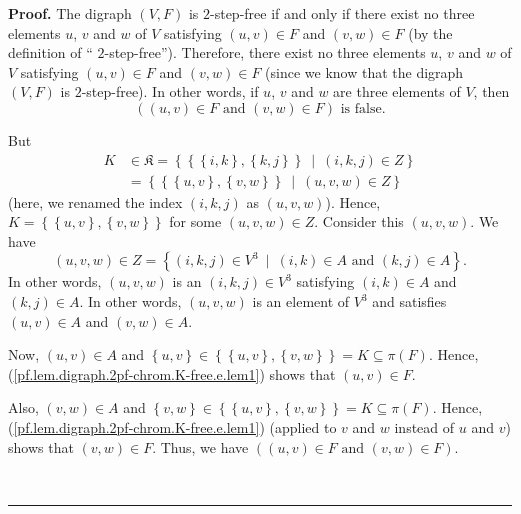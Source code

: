 \documentclass[numbers=enddot,12pt,final,onecolumn,notitlepage]{scrartcl}%
\theoremstyle{definition}
\newenvironment{proof}[1][Proof]{\noindent\textbf{#1.} }{\ \rule{0.5em}{0.5em}}
\newenvironment{verlong}{}{}
\begin{document}
\begin{verlong}
\begin{proof}
The digraph $\left(  V,F\right)  $ is $2$-step-free if and only if there exist
no three elements $u$, $v$ and $w$ of $V$ satisfying $\left(  u,v\right)  \in
F$ and $\left(  v,w\right)  \in F$ (by the definition of \textquotedblleft%
$2$-step-free\textquotedblright). Therefore, there exist no three elements
$u$, $v$ and $w$ of $V$ satisfying $\left(  u,v\right)  \in F$ and $\left(
v,w\right)  \in F$ (since we know that the digraph $\left(  V,F\right)  $ is
$2$-step-free). In other words, if $u$, $v$ and $w$ are three elements of $V$,
then%
\begin{equation}
\left(  \left(  u,v\right)  \in F\text{ and }\left(  v,w\right)  \in F\right)
\text{ is false.} \label{pf.lem.digraph.2pf-chrom.K-free.e.imp1.pf.2}%
\end{equation}


But%
\begin{align*}
K  &  \in\mathfrak{K}=\left\{  \left\{  \left\{  i,k\right\}  ,\left\{
k,j\right\}  \right\}  \ \mid\ \left(  i,k,j\right)  \in Z\right\} \\
&  =\left\{  \left\{  \left\{  u,v\right\}  ,\left\{  v,w\right\}  \right\}
\ \mid\ \left(  u,v,w\right)  \in Z\right\}
\end{align*}
(here, we renamed the index $\left(  i,k,j\right)  $ as $\left(  u,v,w\right)
$). Hence, $K=\left\{  \left\{  u,v\right\}  ,\left\{  v,w\right\}  \right\}
$ for some $\left(  u,v,w\right)  \in Z$. Consider this $\left(  u,v,w\right)
$. We have%
\[
\left(  u,v,w\right)  \in Z=\left\{  \left(  i,k,j\right)  \in V^{3}%
\ \mid\ \left(  i,k\right)  \in A\text{ and }\left(  k,j\right)  \in
A\right\}  .
\]
In other words, $\left(  u,v,w\right)  $ is an $\left(  i,k,j\right)  \in
V^{3}$ satisfying $\left(  i,k\right)  \in A$ and $\left(  k,j\right)  \in A$.
In other words, $\left(  u,v,w\right)  $ is an element of $V^{3}$ and
satisfies $\left(  u,v\right)  \in A$ and $\left(  v,w\right)  \in A$.

Now, $\left(  u,v\right)  \in A$ and $\left\{  u,v\right\}  \in\left\{
\left\{  u,v\right\}  ,\left\{  v,w\right\}  \right\}  =K\subseteq\pi\left(
F\right)  $. Hence, (\ref{pf.lem.digraph.2pf-chrom.K-free.e.lem1}) shows that
$\left(  u,v\right)  \in F$.

Also, $\left(  v,w\right)  \in A$ and $\left\{  v,w\right\}  \in\left\{
\left\{  u,v\right\}  ,\left\{  v,w\right\}  \right\}  =K\subseteq\pi\left(
F\right)  $. Hence, (\ref{pf.lem.digraph.2pf-chrom.K-free.e.lem1}) (applied to
$v$ and $w$ instead of $u$ and $v$) shows that $\left(  v,w\right)  \in F$.
Thus, we have $\left(  \left(  u,v\right)  \in F\text{ and }\left(
v,w\right)  \in F\right)  $.


\end{proof}
\end{verlong}
\end{document}
